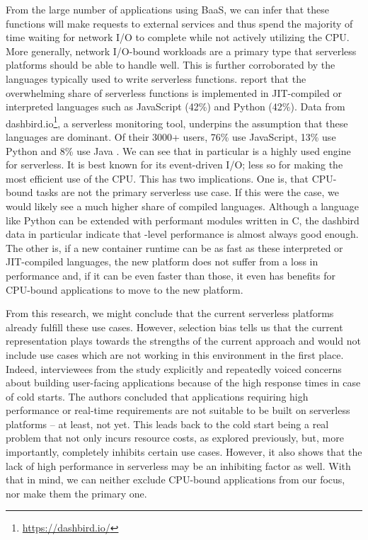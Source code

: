 From the large number of applications using BaaS, we can infer that these functions will make requests to external services and thus spend the majority of time waiting for network I/O to complete while not actively utilizing the CPU. More generally, network I/O-bound workloads are a primary type that serverless platforms should be able to handle well. This is further corroborated by the languages typically used to write serverless functions. \citeauthor{Eismann2021} report that the overwhelming share of serverless functions is implemented in JIT-compiled or interpreted languages such as JavaScript (42\%) and Python (42\%). Data from dashbird.io\footnote{\url{https://dashbird.io/}}, a serverless monitoring tool, underpins the assumption that these languages are dominant. Of their 3000+ users, 76\% use JavaScript, 13\% use Python and 8\% use Java \cite{Rehemaegi2019}. We can see that  in particular is a highly used engine for serverless. It is best known for its event-driven I/O; less so for making the most efficient use of the CPU. This has two implications.
One is, that CPU-bound tasks are not the primary serverless use case. If this were the case, we would likely see a much higher share of compiled languages. Although a language like Python can be extended with performant modules written in C, the dashbird data in particular indicate that -level performance is almost always good enough.
The other is, if a new container runtime can be as fast as these interpreted or JIT-compiled languages, the new platform does not suffer from a loss in performance and, if it can be even faster than those, it even has benefits for CPU-bound applications to move to the new platform.

From this research, we might conclude that the current serverless platforms already fulfill these use cases. However, selection bias tells us that the current representation plays towards the strengths of the current approach and would not include use cases which are not working in this environment in the first place.
Indeed, interviewees from the \citeauthor{Leitner2019} study explicitly and repeatedly voiced concerns about building user-facing applications because of the high response times in case of cold starts. The authors concluded that applications requiring high performance or real-time requirements are not suitable to be built on serverless platforms -- at least, not yet. This leads back to the cold start being a real problem that not only incurs resource costs, as explored previously, but, more importantly, completely inhibits certain use cases.
However, it also shows that the lack of high performance in serverless may be an inhibiting factor as well. With that in mind, we can neither exclude CPU-bound applications from our focus, nor make them the primary one.

